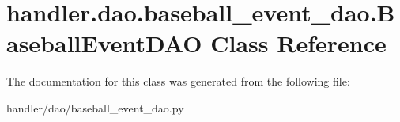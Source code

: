 \hypertarget{classhandler_1_1dao_1_1baseball__event__dao_1_1_baseball_event_d_a_o}{}\section{handler.\+dao.\+baseball\+\_\+event\+\_\+dao.\+Baseball\+Event\+D\+AO Class Reference}
\label{classhandler_1_1dao_1_1baseball__event__dao_1_1_baseball_event_d_a_o}


The documentation for this class was generated from the following file\+:\begin{DoxyCompactItemize}
\item 
handler/dao/baseball\+\_\+event\+\_\+dao.\+py\end{DoxyCompactItemize}
